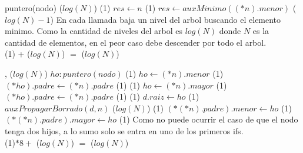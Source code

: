 {   }
{puntero(nodo)}
{\bigo($log(N)$)}
{                              \comment \bigo(1)
        \State $res \gets n$                            \comment \bigo(1)
    \Else
        \State $res \gets auxMinimo((*n).menor)$        \comment \bigo($log(N)-1$)
    \EndIf
}
{   En cada llamada baja un nivel del arbol buscando el elemento minimo. Como la 
    cantidad de niveles del arbol es $log(N)$ donde $N$ es la cantidad de elementos, 
    en el peor caso debe descender por todo el arbol. \\
    \hspace*{8em} \bigo(1) + \bigo($log(N)$) $=$ \bigo($log(N)$) 
}


{   ,
    }
{}
{\bigo($log(N)$)}
{   \var $ho : puntero(nodo)$
                           \comment \bigo(1)
        \State $ho \gets (*n).menor$                    \comment \bigo(1)
        \State $(*ho).padre \gets (*n).padre$           \comment \bigo(1)
    \EndIf
                           \comment \bigo(1)
        \State $ho \gets (*n).mayor$                    \comment \bigo(1)
        \State $(*ho).padre \gets (*n).padre$           \comment \bigo(1)
    \EndIf
                              \comment \bigo(1)
        \State $d.raiz \gets ho$                        \comment \bigo(1)
    \Else
        \State $auxPropagarBorrado(d, n)$               \comment \bigo($log(N)$)
                        \comment \bigo(1)
            \State $(*(*n).padre).menor \gets ho$       \comment \bigo(1)
        \Else
            \State $(*(*n).padre).mayor \gets ho$       \comment \bigo(1)
        \EndIf
    \EndIf
}
{   Como no puede ocurrir el caso de que el nodo tenga dos hijos, a lo sumo
    solo se entra en uno de los primeros ifs. \\
    \hspace*{8em.} \bigo(1)$*8 +$ \bigo($log(N)$) $=$ \bigo($log(N)$) }


